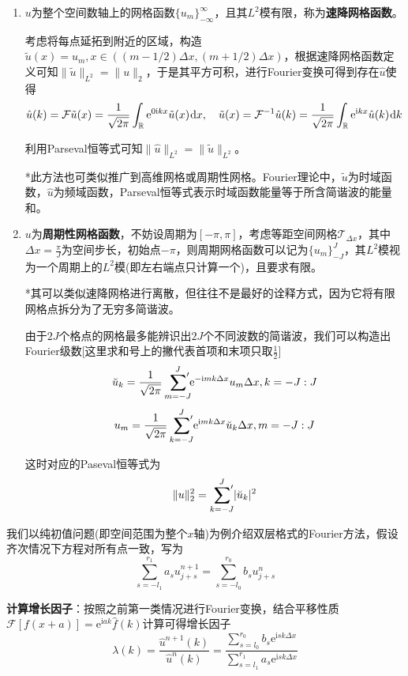 \documentclass[a4paper,UTF8,fontset=windows]{ctexart}
\newcommand*{\dr}{\hspace{0.07em}\mathrm{d}}
\begin{document}
\begin{enumerate}
    \item $u$为整个空间数轴上的网格函数$\{u_m\}_{-\infty}^\infty$，且其$L^2$模有限，称为\textbf{速降网格函数}。

    考虑将每点延拓到附近的区域，构造$\tilde{u}(x)=u_m, x\in((m-1/2)\Delta x,(m+1/2)\Delta x)$，根据速降网格函数定义可知$\|\tilde{u}\|_{L^2}=\|u\|_2$，于是其平方可积，进行Fourier变换可得到存在$\hat{u}$使得
    $$\hat{u}(k)=\mathcal{F}\tilde{u}(x)=\frac{1}{\sqrt{2\pi}}\int_\mathbb{R}\mathrm{e}^{0\mathrm{i}kx}\tilde{u}(x)\dr x,\quad \tilde{u}(x)=\mathcal{F}^{-1}\hat{u}(k)=\frac{1}{\sqrt{2\pi}}\int_\mathbb{R}\mathrm{e}^{\mathrm{i}kx}\hat{u}(k)\dr k$$
    
    利用Parseval恒等式可知$\|\hat{u}\|_{L^2}=\|\tilde{u}\|_{L^2}$。
    
    *此方法也可类似推广到高维网格或周期性网格。Fourier理论中，$\tilde{u}$为时域函数，$\hat{u}$为频域函数，Parseval恒等式表示时域函数能量等于所含简谐波的能量和。

    \item $u$为\textbf{周期性网格函数}，不妨设周期为$[-\pi,\pi]$，考虑等距空间网格$\mathcal{T}_{\Delta x}$，其中$\Delta x=\frac{\pi}{J}$为空间步长，初始点$-\pi$，则周期网格函数可以记为$\{u_m\}_{-J}^J$，其$L^2$模视为一个周期上的$L^2$模(即左右端点只计算一个)，且要求有限。
    
    *其可以类似速降网格进行离散，但往往不是最好的诠释方式，因为它将有限网格点拆分为了无穷多简谐波。

    由于$2J$个格点的网格最多能辨识出$2J$个不同波数的简谐波，我们可以构造出Fourier级数[这里求和号上的撇代表首项和末项只取$\frac{1}{2}$]
    $$\breve{u}_k=\frac{1}{\sqrt{2\pi}}\sum_{m=-J}^J\hspace{-2.05em}{\sum}'\mathrm{e}^{-\mathrm{i}mk\Delta x}u_m\Delta x,k=-J:J$$
    $$u_m=\frac{1}{\sqrt{2\pi}}\sum_{k=-J}^J\hspace{-1.92em}{\sum}'\mathrm{e}^{\mathrm{i}mk\Delta x}\breve{u}_k\Delta x,m=-J:J$$

    这时对应的Paseval恒等式为
    $$\|u\|_2^2=\sum_{k=-J}^J\hspace{-1.92em}{\sum}'|\breve{u}_k|^2$$
\end{enumerate}

我们以纯初值问题(即空间范围为整个$x$轴)为例介绍双层格式的Fourier方法，假设齐次情况下方程对所有点一致，写为
$$\sum_{s=-l_1}^{r_1}a_su_{j+s}^{n+1}=\sum_{s=-l_0}^{r_0}b_su_{j+s}^n$$

\textbf{计算增长因子}：按照之前第一类情况进行Fourier变换，结合平移性质$\mathcal{F}[f(x+a)]=\mathrm{e}^{\mathrm{i}ak}\hat{f}(k)$计算可得增长因子
$$\lambda(k)=\frac{\hat{u}^{n+1}(k)}{\hat{u}^n(k)}=\frac{\sum_{s=l_0}^{r_0}b_s\mathrm{e}^{\mathrm{i}sk\Delta x}}{\sum_{s=l_1}^{r_1}a_s\mathrm{e}^{\mathrm{i}sk\Delta x}}$$
\end{document}
